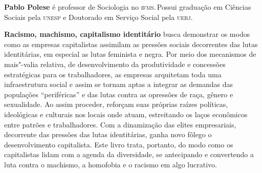 \textbf{Pablo Polese} é professor de Sociologia no \textsc{ifms}.\,Possui graduação em
Ciências Sociais pela \textsc{unesp} e Doutorado em Serviço Social pela \textsc{uerj}.

\textbf{Racismo, machismo, capitalismo identitário} busca demonstrar os modos como as empresas capitalistas assimilam as
pressões sociais decorrentes das lutas identitárias, em especial as
lutas feminista e negra. Por meio dos mecanismos de mais"-valia relativa,
de desenvolvimento da produtividade e concessões estratégicas para os
trabalhadores, as empresas arquitetam toda uma infraestrutura social e
assim se tornam aptas a integrar as demandas das populações
``periféricas'' e das lutas contra as opressões de raça, gênero e
sexualidade. Ao assim proceder, reforçam suas próprias raízes políticas,
ideológicas e culturais nos locais onde atuam, estreitando os laços
econômicos entre patrões e trabalhadores. Com a dinamização das elites
empresariais, decorrente das pressões das lutas identitárias, ganha novo
fôlego o desenvolvimento capitalista. Este livro trata, portanto, do
modo como os capitalistas lidam com a agenda da diversidade, se
antecipando e convertendo a luta contra o machismo, a homofobia e o
racismo em algo lucrativo.

